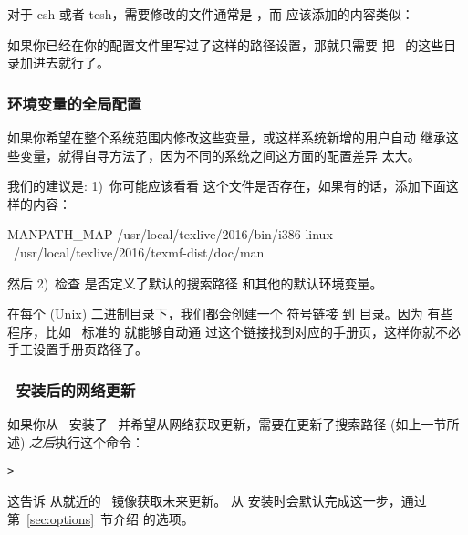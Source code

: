 \documentclass{article}
\begin{document}
对于 csh 或者 tcsh，需要修改的文件通常是 ，而
应该添加的内容类似：


如果你已经在你的配置文件里写过了这样的路径设置，那就只需要
把 \TL\ 的这些目录加进去就行了。

\subsubsection{环境变量的全局配置}
\label{sec:envglobal}

如果你希望在整个系统范围内修改这些变量，或这样系统新增的用户自动
继承这些变量，就得自寻方法了，因为不同的系统之间这方面的配置差异
太大。

我们的建议是: 1)~你可能应该看看 
这个文件是否存在，如果有的话，添加下面这样的内容：

\begin{sverbatim}
MANPATH_MAP /usr/local/texlive/2016/bin/i386-linux \
            /usr/local/texlive/2016/texmf-dist/doc/man
\end{sverbatim}

然后 2)~检查  是否定义了默认的搜索路径
和其他的默认环境变量。

在每个 (Unix) 二进制目录下，我们都会创建一个  符号链接
到  目录。因为
有些 \code{man} 程序，比如 \MacOSX\ 标准的  就能够自动通
过这个链接找到对应的手册页，这样你就不必手工设置手册页路径了。

\subsubsection{\DVD\ 安装后的网络更新}
\label{sec:dvd-install-net-updates}

如果你从 \DVD\ 安装了 \TL\ 并希望从网络获取更新，需要在更新了搜索路径
(如上一节所述) \emph{之后}执行这个命令：

\begin{alltt}
> 
\end{alltt}

这告诉  从就近的 \CTAN\ 镜像获取未来更新。
从 \DVD{} 安装时会默认完成这一步，通过第~\ref{sec:options}~节介绍
的选项。
\end{document}
